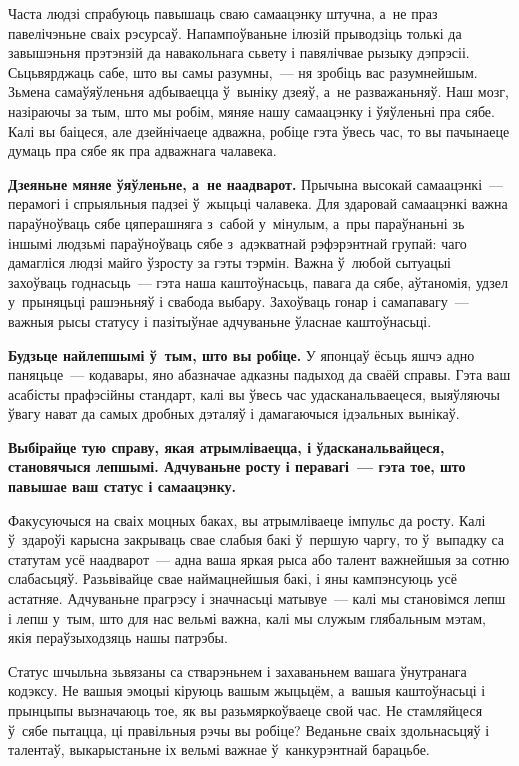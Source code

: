 Часта людзі спрабуюць павышаць сваю самаацэнку штучна, а~не праз павелічэньне сваіх рэсурсаў. Напампоўваньне ілюзій прыводзіць толькі да завышэньня прэтэнзій да навакольнага сьвету і павялічвае рызыку дэпрэсіі. Сьцьвярджаць сабе, што вы самы разумны,~--- ня зробіць вас разумнейшым. Зьмена самаўяўленьня адбываецца ў~выніку дзеяў, а~не разважаньняў. Наш мозг, назіраючы за тым, што мы робім, мяняе нашу самаацэнку і ўяўленьні пра сябе. Калі вы баіцеся, але дзейнічаеце адважна, робіце гэта ўвесь час, то вы пачынаеце думаць пра сябе як пра адважнага чалавека.

\textbf{Дзеяньне мяняе ўяўленьне, а~не наадварот.} Прычына высокай самаацэнкі~--- перамогі і спрыяльныя падзеі ў~жыцьці чалавека. Для здаровай самаацэнкі важна параўноўваць сябе цяперашняга з~сабой у~мінулым, а~пры параўнаньні зь іншымі людзьмі параўноўваць сябе з~адэкватнай рэфэрэнтнай групай: чаго дамагліся людзі майго ўзросту за гэты тэрмін. Важна ў~любой сытуацыі захоўваць годнасьць~--- гэта наша каштоўнасьць, павага да сябе, аўтаномія, удзел у~прыняцьці рашэньняў і свабода выбару. Захоўваць гонар і самапавагу~--- важныя рысы статусу і пазітыўнае адчуваньне ўласнае каштоўнасьці.

\textbf{Будзьце найлепшымі ў~тым, што вы робіце.} У японцаў ёсьць яшчэ адно паняцьце~--- кодавары, яно абазначае адказны падыход да сваёй справы. Гэта ваш асабісты прафэсійны стандарт, калі вы ўвесь час удасканальваецеся, выяўляючы ўвагу нават да самых дробных дэталяў і дамагаючыся ідэальных вынікаў.

\textbf{Выбірайце тую справу, якая атрымліваецца, і ўдасканальвайцеся, становячыся лепшымі. Адчуваньне росту і перавагі~--- гэта тое, што павышае ваш статус і самаацэнку.}

Факусуючыся на сваіх моцных баках, вы атрымліваеце імпульс да росту. Калі ў~здароўі карысна закрываць свае слабыя бакі ў~першую чаргу, то ў~выпадку са статутам усё наадварот~--- адна ваша яркая рыса або талент важнейшыя за сотню слабасьцяў. Разьвівайце свае наймацнейшыя бакі, і яны кампэнсуюць усё астатняе. Адчуваньне прагрэсу і значнасьці матывуе~--- калі мы становімся лепш і лепш у~тым, што для нас вельмі важна, калі мы служым глябальным мэтам, якія пераўзыходзяць нашы патрэбы.

Статус шчыльна зьвязаны са стварэньнем і захаваньнем вашага ўнутранага кодэксу. Не вашыя эмоцыі кіруюць вашым жыцьцём, а~вашыя каштоўнасьці і прынцыпы вызначаюць тое, як вы разьмяркоўваеце свой час. Не стамляйцеся ў~сябе пытацца, ці правільныя рэчы вы робіце? Веданьне сваіх здольнасьцяў і талентаў, выкарыстаньне іх вельмі важнае ў~канкурэнтнай барацьбе.

